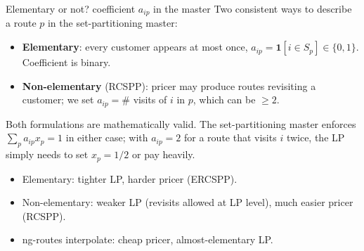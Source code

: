 \documentclass[10pt,aspectratio=169]{beamer}
\begin{document}
\begin{frame}{Elementary or not? coefficient $a_{ip}$ in the master}
  Two consistent ways to describe a route $p$ in the set-partitioning master:
  \begin{itemize}\small
    \item \textbf{Elementary}: every customer appears at most once,
          $a_{ip}\!=\!\mathbf 1[i\in S_p]\in\{0,1\}$. Coefficient is binary.
    \item \textbf{Non-elementary} (RCSPP): pricer may produce routes
          revisiting a customer; we set $a_{ip}\!=\!\#$ visits of $i$ in $p$,
          which can be $\ge 2$.
  \end{itemize}
  \begin{tcolorbox}[colback=accent!5,colframe=accent!60,sharp corners,boxrule=0.4pt]
    Both formulations are mathematically valid. The set-partitioning master
    enforces $\sum_p a_{ip} x_p = 1$ in either case; with $a_{ip}\!=\!2$
    for a route that visits $i$ twice, the LP simply needs to set $x_p\!=\!1/2$
    or pay heavily.
  \end{tcolorbox}
  \begin{itemize}\small
    \item Elementary: tighter LP, harder pricer (ERCSPP).
    \item Non-elementary: weaker LP (revisits allowed at LP level), much
          easier pricer (RCSPP).
    \item ng-routes interpolate: cheap pricer, almost-elementary LP.
  \end{itemize}
\end{frame}
\end{document}
